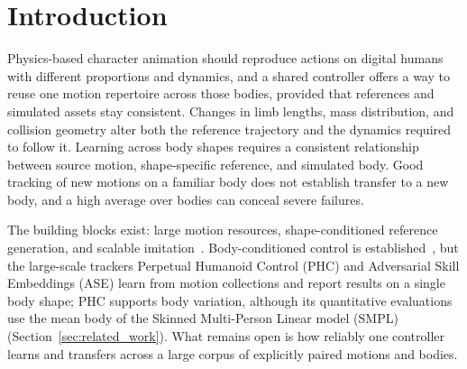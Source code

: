 \section{Introduction}\label{sec:introduction}
Physics-based character animation should reproduce actions on digital humans
with different proportions and dynamics, and a shared controller offers a way
to reuse one motion repertoire across those bodies, provided that references
and simulated assets stay consistent. Changes in limb lengths, mass
distribution, and collision geometry alter both the reference trajectory and the
dynamics required to follow it. Learning across body shapes requires a
consistent relationship between source motion, shape-specific reference, and
simulated body. Good tracking of new motions on a
familiar body does not establish transfer to a new body, and a high average
over bodies can conceal severe failures.

The building blocks exist: large motion resources, shape-conditioned reference
generation, and scalable imitation~\cite{amass,humanml3d,humos,phc,protomotions}.
Body-conditioned control is established~\cite{won2019}, but the large-scale
trackers Perpetual Humanoid Control (PHC) and Adversarial Skill Embeddings
(ASE) learn from motion collections and report results on a single body shape;
PHC supports body variation, although its quantitative evaluations use the mean
body of the Skinned Multi-Person Linear model (SMPL)~\cite{phc,ase,smpl}
(Section~\ref{sec:related_work}). What remains open is how reliably one
controller learns and transfers across a large corpus of explicitly paired
motions and bodies.

